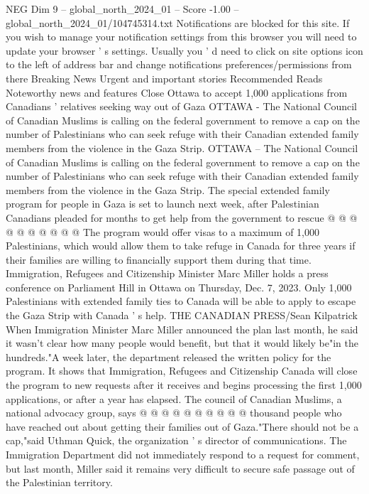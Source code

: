 \begin{textsample}{NEG Dim 9 – global\_north\_2024\_01 – Score -1.00 – global\_north\_2024\_01/104745314.txt}  \label{ex:f9_neg_193}
Notifications are blocked for this site.
If you wish to manage your notification settings from this browser you will need to update your browser ' s settings.
Usually you ' d need to click on site options icon to the left of address bar and change notifications preferences/permissions from there Breaking News Urgent and important stories Recommended Reads Noteworthy news and features Close Ottawa to accept 1,000 applications from Canadians ' relatives seeking way out of Gaza OTTAWA - The National Council of Canadian Muslims is calling on the federal government to remove a cap on the number of Palestinians who can seek refuge with their Canadian extended family members from the violence in the Gaza Strip.
OTTAWA -- The National Council of Canadian Muslims is calling on the federal government to remove a cap on the number of Palestinians who can seek refuge with their Canadian extended family members from the violence in the Gaza Strip.
The special extended family program for people in Gaza is set to launch next week, after Palestinian Canadians pleaded for months to get help from the government to rescue @ @ @ @ @ @ @ @ @ @ The program would offer visas to a maximum of 1,000 Palestinians, which would allow them to take refuge in Canada for three years if their families are willing to financially support them during that time.
Immigration, Refugees and Citizenship Minister Marc Miller holds a press conference on Parliament Hill in Ottawa on Thursday, Dec. 7, 2023.
Only 1,000 Palestinians with extended family ties to Canada will be able to apply to escape the Gaza Strip with Canada ' s help.
THE CANADIAN PRESS/Sean Kilpatrick When Immigration Minister Marc Miller announced the plan last month, he said it wasn't clear how many people would benefit, but that it would likely be"in the hundreds."A week later, the department released the written policy for the program.
It shows that Immigration, Refugees and Citizenship Canada will close the program to new requests after it receives and begins processing the first 1,000 applications, or after a year has elapsed.
The council of Canadian Muslims, a national advocacy group, says @ @ @ @ @ @ @ @ @ @ thousand people who have reached out about getting their families out of Gaza."There should not be a cap,"said Uthman Quick, the organization ' s director of communications.
The Immigration Department did not immediately respond to a request for comment, but last month, Miller said it remains very difficult to secure safe passage out of the Palestinian territory.

\end{textsample}
